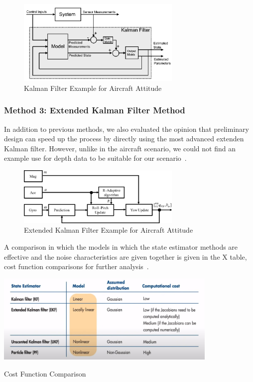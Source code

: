 \documentclass[12pt]{article}
\begin{document}
\begin{figure}[H]
    \centering
    \includegraphics[width=0.7\textwidth]{KF.png}
    \caption{Kalman Filter Example for Aircraft Attitude}
\end{figure}

\subsubsection{Method 3: Extended Kalman Filter Method}
In addition to previous methods, we also evaluated the opinion that preliminary design can speed up the process by directly using the most advanced extenden Kalman filter. However, unlike in the aircraft scenario, we could not find an example use for depth data to be suitable for our scenario~\cite{9307398}.

\begin{figure}[H]
    \centering
    \includegraphics[width=0.7\textwidth]{EKF.png}
    \caption{Extended Kalman Filter Example for Aircraft Attitude}
\end{figure}

A comparison in which the models in which the state estimator methods are effective and the noise characteristics are given together is given in the X table, cost function comparisons for further analysis~\cite{The_cost_function_of_the_data_fusion_process_and_i}.

\begin{table}[H]
    \centering
    \includegraphics[width=0.8\textwidth]{CostComparison.jpeg}
    \caption{Cost Function Comparison}
\end{table}
\end{document}
